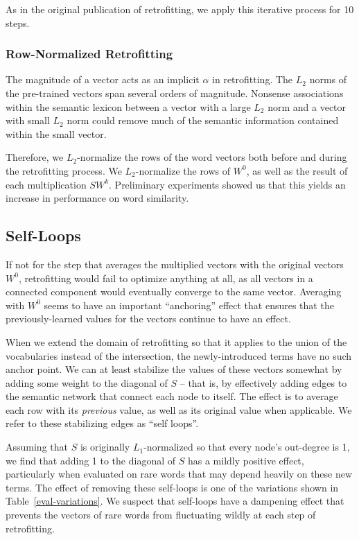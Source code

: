 \documentclass[letterpaper]{article}
\begin{document}
As in the original publication of retrofitting, we apply this iterative process
for 10 steps.

\subsubsection{Row-Normalized Retrofitting}

The magnitude of a vector acts as an implicit $\alpha$ in retrofitting.
The $L_2$ norms of the pre-trained vectors span several orders of magnitude.
Nonsense associations within the semantic lexicon between a vector with a large
$L_2$ norm and a vector with small $L_2$ norm could remove much of the semantic
information contained within the small vector.

Therefore, we $L_2$-normalize
the rows of the word vectors both before and during the retrofitting process.
We $L_2$-normalize the rows of $W^0$, as well as the result of each
multiplication $S W^k$. Preliminary experiments showed us that this yields
an increase in performance on word similarity.

\subsection{Self-Loops}
If not for the step that averages the multiplied vectors with the original
vectors $W^0$, retrofitting would fail to optimize anything at all, as all
vectors in a connected component would eventually converge to the same vector.
Averaging with $W^0$ seems to have an important ``anchoring'' effect that
ensures that the previously-learned values for the vectors continue to have
an effect.

When we extend the domain of retrofitting so that it applies to the union of
the vocabularies instead of the intersection, the newly-introduced terms have
no such anchor point. We can at least stabilize the values of these vectors
somewhat by adding some weight to the diagonal of $S$ -- that is, by
effectively adding edges to the semantic network that connect each node to
itself. The effect is to average each row with its {\em previous} value, as
well as its original value when applicable. We refer to these stabilizing edges
as ``self loops''.

Assuming that $S$ is originally $L_1$-normalized so that every node's
out-degree is 1, we find that adding 1 to the diagonal of $S$ has a mildly
positive effect, particularly when evaluated on rare words that may depend
heavily on these new terms. The effect of removing these self-loops is one of
the variations shown in Table~\ref{eval-variations}.  We suspect that
self-loops have a dampening effect that prevents the vectors of rare words from
fluctuating wildly at each step of retrofitting.
\end{document}
